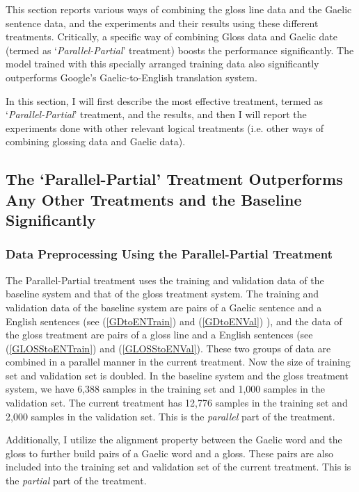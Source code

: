 \documentclass[a4paper]{article}
\begin{document}
This section reports various ways of combining the gloss line data and the Gaelic sentence data, and the experiments and their results using these different treatments. Critically, a specific way of combining Gloss data and Gaelic date (termed as `\textit{Parallel-Partial}' treatment) boosts the performance significantly. The model trained with this specially arranged training data also significantly outperforms Google's Gaelic-to-English translation system.

In this section, I will first describe the most effective treatment, termed as `\textit{Parallel-Partial}' treatment, and the results, and then I will report the experiments done with other relevant logical treatments (i.e. other ways of combining glossing data and Gaelic data). 

\subsection{The `Parallel-Partial' Treatment Outperforms Any Other Treatments and the Baseline Significantly}

\subsubsection{Data Preprocessing Using the Parallel-Partial Treatment}
The Parallel-Partial treatment uses the training and validation data of the baseline system and that of the gloss treatment system.  
The training and validation data of the baseline system are pairs of a Gaelic sentence and a English sentences (see (\ref{GDtoENTrain}) and (\ref{GDtoENVal}) ), 
and the data of the gloss treatment are pairs of a gloss line and a English sentences (see (\ref{GLOSStoENTrain}) and (\ref{GLOSStoENVal}). 
These two groups of data are combined in a parallel manner in the current treatment. Now the size of training set and validation set is doubled. In the baseline system and the gloss treatment system, we have 6,388 samples in the training set and 1,000 samples in the validation set. The current treatment has 12,776 samples in the training set and 2,000 samples in the validation set. This is the \textit{parallel} part of the treatment. 

Additionally, I utilize the alignment property between the Gaelic word and the gloss to further build pairs of a Gaelic word and a gloss. These pairs are also included into the training set and validation set of the current treatment. This is the \textit{partial} part of the treatment.   
\end{document}
